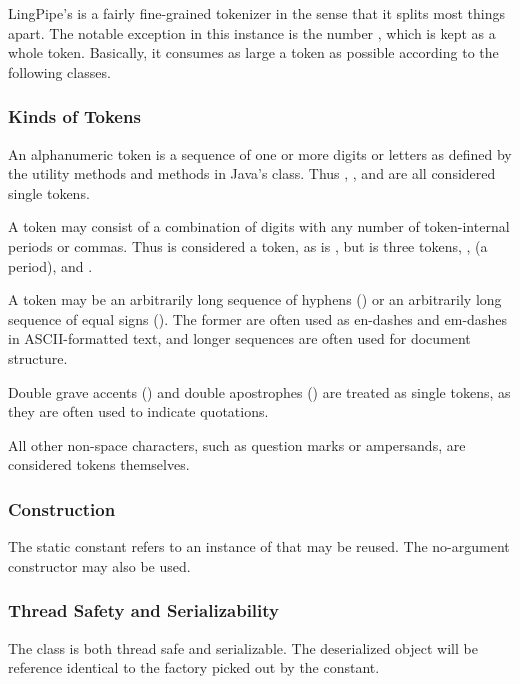 LingPipe's  is a fairly fine-grained
tokenizer in the sense that it splits most things apart.  The notable
exception in this instance is the number , which
is kept as a whole token.  Basically, it consumes as large a token
as possible according to the following classes.

\subsubsection{Kinds of Tokens}

An alphanumeric token is a sequence of one or more digits or letters
as defined by the utility methods  and
 methods in Java's  class.  Thus
, , and  are all
considered single tokens.

A token may consist of a combination of digits with any number of
token-internal periods or commas.  Thus  is
considered a token, as is , but
 is three tokens, ,
 (a period), and .

A token may be an arbitrarily long sequence of hyphens (\code{-}) or
an arbitrarily long sequence of equal signs (\code{=}).  The former
are often used as en-dashes and em-dashes in ASCII-formatted text,
and longer sequences are often used for document structure.

Double grave accents () and double apostrophes () are
treated as single tokens, as they are often used to indicate quotations.

All other non-space characters, such as question marks or ampersands,
are considered tokens themselves.

\subsubsection{Construction}

The static constant  refers to an instance of
 that may be reused.   The
no-argument constructor may also be used.


\subsubsection{Thread Safety and Serializability}

The  class is both thread safe and
serializable.  The deserialized object will be reference identical
to the factory picked out by the  constant.




